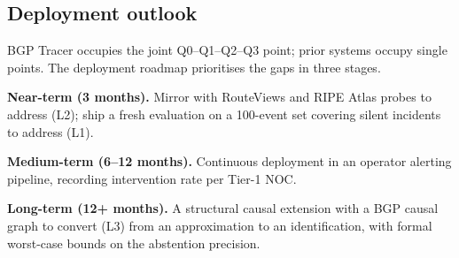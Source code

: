 \subsection{Deployment outlook}

BGP Tracer occupies the joint Q0--Q1--Q2--Q3 point; prior systems occupy single points. The deployment roadmap prioritises the gaps in three stages.

\textbf{Near-term (3 months).} Mirror with RouteViews and RIPE Atlas probes to address (L2); ship a fresh evaluation on a 100-event set covering silent incidents to address (L1).

\textbf{Medium-term (6--12 months).} Continuous deployment in an operator alerting pipeline, recording intervention rate per Tier-1 NOC.

\textbf{Long-term (12+ months).} A structural causal extension with a BGP causal graph to convert (L3) from an approximation to an identification, with formal worst-case bounds on the abstention precision.

